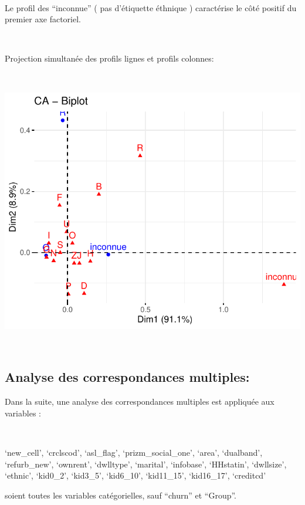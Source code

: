 \documentclass[]{imsart}
\numberwithin{equation}{section}
\theoremstyle{plain}
\begin{document}
~

Le profil des ``inconnue'' ( pas d'étiquette éthnique ) caractérise le côté positif du premier axe factoriel.

~

Projection simultanée des profils lignes et profils colonnes:

~

\begin{flushleft}\includegraphics{Analyse_Exploratoire_Projet_files/figure-latex/unnamed-chunk-30-1} \end{flushleft}

~

\hypertarget{analyse-des-correspondances-multiples}{%
\subsection{Analyse des correspondances multiples:}\label{analyse-des-correspondances-multiples}}

Dans la suite, une analyse des correspondances multiples est appliquée aux variables :

~

`new\_cell', `crclscod', `asl\_flag', `prizm\_social\_one', `area', `dualband', `refurb\_new', `ownrent', `dwlltype', `marital', `infobase', `HHstatin', `dwllsize', `ethnic', `kid0\_2', `kid3\_5', `kid6\_10', `kid11\_15', `kid16\_17', `creditcd'

soient toutes les variables catégorielles, sauf ``churn'' et ``Group''.

~
\end{document}
